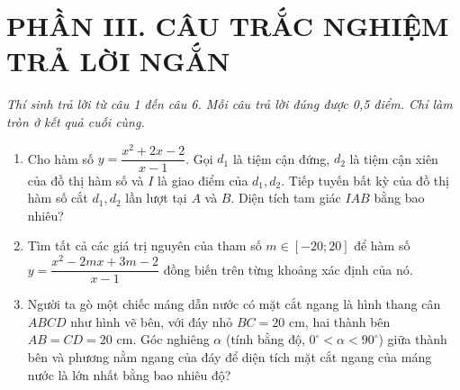 \documentclass[12pt,a4paper]{article}
\begin{document}
\section*{\large PHẦN III. CÂU TRẮC NGHIỆM TRẢ LỜI NGẮN}
\textit{Thí sinh trả lời từ câu 1 đến câu 6. Mỗi câu trả lời đúng được 0,5 điểm. Chỉ làm tròn ở kết quả cuối cùng.}
\begin{enumerate}
\item Cho hàm số $y = \dfrac{x^2 + 2x - 2}{x - 1}$. Gọi $d_1$ là tiệm cận đứng, $d_2$ là tiệm cận xiên của đồ thị hàm số và $I$ là giao điểm của $d_1, d_2$. Tiếp tuyến bất kỳ của đồ thị hàm số cắt $d_1, d_2$ lần lượt tại $A$ và $B$. Diện tích tam giác $IAB$ bằng bao nhiêu?

\item Tìm tất cả các giá trị nguyên của tham số $m \in [-20; 20]$ để hàm số $y = \dfrac{x^2 - 2mx + 3m - 2}{x - 1}$ đồng biến trên từng khoảng xác định của nó.

\item \begin{minipage}[t]{0.56\linewidth}
Người ta gò một chiếc máng dẫn nước có mặt cắt ngang là hình thang cân $ABCD$ như hình vẽ bên, với đáy nhỏ $BC = 20\text{ cm}$, hai thành bên $AB = CD = 20\text{ cm}$. Góc nghiêng $\alpha$ (tính bằng độ, $0^\circ < \alpha < 90^\circ$) giữa thành bên và phương nằm ngang của đáy để diện tích mặt cắt ngang của máng nước là lớn nhất bằng bao nhiêu độ?
\end{minipage}\hfill
\begin{minipage}[t]{0.41\linewidth}\vspace{-0.4\baselineskip}\centering
{}
\end{minipage}


\end{enumerate}
\end{document}

